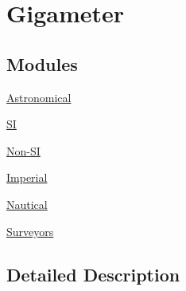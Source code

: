 \hypertarget{group___e_g_x_math-_conversions-_length_conversions-_s_i-_gigameter}{}\section{Gigameter}
\label{group___e_g_x_math-_conversions-_length_conversions-_s_i-_gigameter}
\subsection*{Modules}
\begin{DoxyCompactItemize}
\item 
\mbox{\hyperlink{group___e_g_x_math-_conversions-_length_conversions-_s_i-_gigameter-_astronomical}{Astronomical}}
\item 
\mbox{\hyperlink{group___e_g_x_math-_conversions-_length_conversions-_s_i-_gigameter-_s_i}{SI}}
\item 
\mbox{\hyperlink{group___e_g_x_math-_conversions-_length_conversions-_s_i-_gigameter-_non-_s_i}{Non-\/\+SI}}
\item 
\mbox{\hyperlink{group___e_g_x_math-_conversions-_length_conversions-_s_i-_gigameter-_imperial}{Imperial}}
\item 
\mbox{\hyperlink{group___e_g_x_math-_conversions-_length_conversions-_s_i-_gigameter-_nautical}{Nautical}}
\item 
\mbox{\hyperlink{group___e_g_x_math-_conversions-_length_conversions-_s_i-_gigameter-_surveyors}{Surveyors}}
\end{DoxyCompactItemize}


\subsection{Detailed Description}
